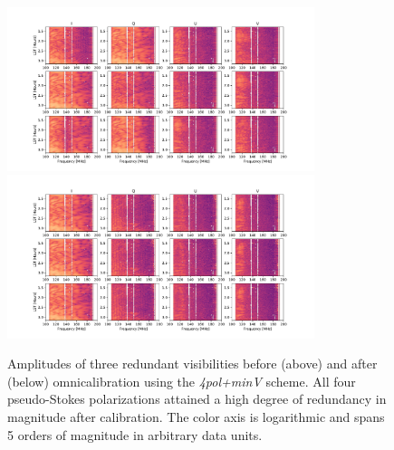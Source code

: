 \begin{figure}
\centering
\includegraphics[width=0.8\textwidth]{chapters/psa128_pol/figures/nocal_IQUV_6680_0-5.pdf}
\includegraphics[width=0.8\textwidth]{chapters/psa128_pol/figures/omnical_IQUV_6680_0-5.pdf}
\caption[Amplitudes of three redundant visibilities before and after {\sc omnical}ibration using the \textit{4pol+minV} scheme.]{Amplitudes of three redundant visibilities before (above) and after (below) {\sc omnical}ibration using the \textit{4pol+minV} scheme. All four pseudo-Stokes polarizations attained a high degree of redundancy in magnitude after calibration. The color axis is logarithmic and spans 5 orders of magnitude in arbitrary data units.}
\label{fig:psa128_pre_post_abs}
\end{figure}

